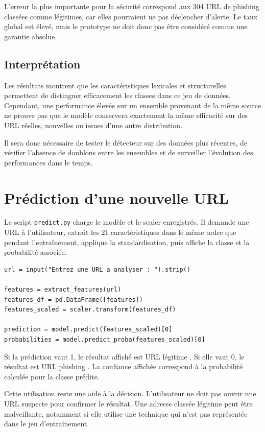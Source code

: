 \documentclass[11pt,a4paper]{report}
\begin{document}
L'erreur la plus importante pour la sécurité correspond aux 304 URL de
phishing classées comme légitimes, car elles pourraient ne pas déclencher
d'alerte. Le taux global est élevé, mais le prototype ne doit donc pas être
considéré comme une garantie absolue.

\section{Interprétation}

Les résultats montrent que les caractéristiques lexicales et structurelles
permettent de distinguer efficacement les classes dans ce jeu de données.
Cependant, une performance élevée sur un ensemble provenant de la même source
ne prouve pas que le modèle conservera exactement la même efficacité sur des
URL réelles, nouvelles ou issues d'une autre distribution.

Il sera donc nécessaire de tester le détecteur sur des données plus récentes,
de vérifier l'absence de doublons entre les ensembles et de surveiller
l'évolution des performances dans le temps.

\chapter{Prédiction d'une nouvelle URL}

Le script \texttt{predict.py} charge le modèle et le scaler enregistrés. Il
demande une URL à l'utilisateur, extrait les 21 caractéristiques dans le même
ordre que pendant l'entraînement, applique la standardisation, puis affiche la
classe et la probabilité associée.

\begin{lstlisting}[caption={Principe de la prédiction interactive}]
url = input("Entrez une URL a analyser : ").strip()

features = extract_features(url)
features_df = pd.DataFrame([features])
features_scaled = scaler.transform(features_df)

prediction = model.predict(features_scaled)[0]
probabilities = model.predict_proba(features_scaled)[0]
\end{lstlisting}

Si la prédiction vaut 1, le résultat affiché est \og URL légitime \fg. Si elle
vaut 0, le résultat est \og URL phishing \fg. La confiance affichée correspond
à la probabilité calculée pour la classe prédite.

Cette utilisation reste une aide à la décision. L'utilisateur ne doit pas
ouvrir une URL suspecte pour confirmer le résultat. Une adresse classée
légitime peut être malveillante, notamment si elle utilise une technique qui
n'est pas représentée dans le jeu d'entraînement.
\end{document}
